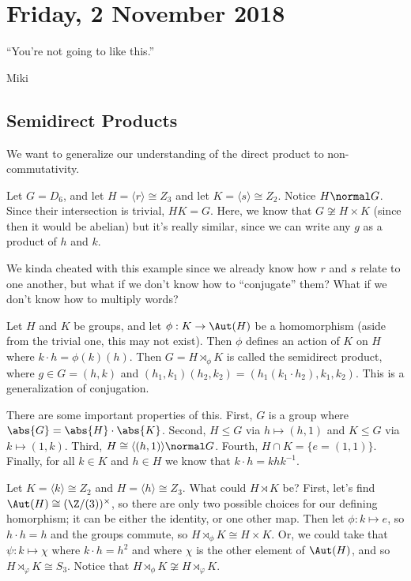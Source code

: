 \section{Friday, 2 November 2018}

\epigraph{``You're not going to like this.''}{Miki}

\subsection{Semidirect Products}
We want to generalize our understanding of the direct product to non-commutativity.

\begin{example}
Let $G = D_6$, and let $H = \langle r  \rangle \cong Z_3$ and let $K = \langle s \rangle \cong Z_2$. Notice $H \normal G$. Since their intersection is trivial, $HK = G$. Here, we know that $G \not\cong H \times K$ (since then it would be abelian) but it's really similar, since we can write any $g$ as a product of $h$ and $k$.
\end{example}

We kinda cheated with this example since we already know how $r$ and $s$ relate to one another, but what if we don't know how to ``conjugate'' them? What if we don't know how to multiply words?

\begin{definition}
Let $H$ and $K$ be groups, and let $\phi : K \to \Aut(H)$ be a homomorphism (aside from the trivial one, this may not exist). Then $\phi$ defines an action of $K$ on $H$ where $k \cdot h = \phi(k)(h)$. Then $G = H \rtimes_\phi K$ is called the semidirect product, where $g \in G = (h,k)$ and $(h_1,k_1)(h_2,k_2) = (h_1(k_1 \cdot h_2), k_1,k_2)$. This is a generalization of conjugation.
\end{definition}

There are some important properties of this. First, $G$ is a group where $\abs{G} = \abs{H} \cdot \abs{K}$. Second, $H \leq G$ via $h \mapsto (h,1)$ and $K \leq G$ via $k \mapsto (1,k)$. Third, $H \cong \langle (h,1) \rangle \normal G$. Fourth, $H \cap K = \{e = (1,1)\}$. Finally, for all $k \in K$ and $h \in H$ we know that $k \cdot h = khk^{-1}$.

\begin{example}
Let $K = \langle k \rangle \cong Z_2$ and $H = \langle h \rangle  \cong Z_3$. What could $H \rtimes K$ be? First, let's find $\Aut(H) \cong (\Z/(3))^\times$, so there are only two possible choices for our defining homorphism; it can be either the identity, or one other map. Then let $\phi : k \mapsto e$, so $h \cdot h = h$ and the groups commute, so $H \rtimes_\phi K \cong H \times K$. Or, we could take that $\psi : k \mapsto \chi$ where $k \cdot h = h^2$ and where $\chi$ is the other element of $\Aut(H)$, and so $H \rtimes_\varphi K \cong S_3$. Notice that $H \rtimes_\phi K \not\cong H \rtimes_\varphi K$.
\end{example}


